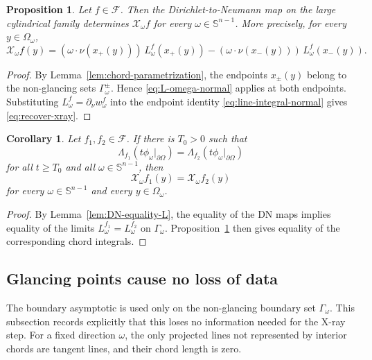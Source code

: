 \documentclass[11pt]{article}
\numberwithin{equation}{section}
\newtheorem{proposition}[theorem]{Proposition}
\newtheorem{corollary}[theorem]{Corollary}
\newcommand{\Sn}{\mathbb S^{n-1}}
\newcommand{\bd}{\partial}
\newcommand{\Om}{\Omega}
\newcommand{\DN}{\Lambda}
\newcommand{\Xray}{\mathcal X}
\begin{document}
\begin{proposition}\label{prop:recover-xray}
Let \(f\in\mathcal F\).  Then the Dirichlet-to-Neumann map on the large cylindrical family determines \(\Xray_\omega f\) for every \(\omega\in\Sn\).  More precisely, for every \(y\in\Omega_\omega\),
\begin{equation}\label{eq:recover-xray}
    \Xray_\omega f(y)
    =
    (\omega\cdot\nu(x_+(y)))\,L_\omega^f(x_+(y))
    -
    (\omega\cdot\nu(x_-(y)))\,L_\omega^f(x_-(y)).
\end{equation}
\end{proposition}

\begin{proof}
By Lemma~\ref{lem:chord-parametrization}, the endpoints \(x_\pm(y)\) belong to the non-glancing sets \(\Gamma_\omega^\pm\).  Hence \eqref{eq:L-omega-normal} applies at both endpoints.  Substituting \(L_\omega^f=\partial_\nu w_\omega^f\) into the endpoint identity \eqref{eq:line-integral-normal} gives \eqref{eq:recover-xray}.
\end{proof}

\begin{corollary}\label{cor:DN-equality-xray}
Let \(f_1,f_2\in\mathcal F\).  If there is \(T_0>0\) such that
\[
    \DN_{f_1}(t\phi_\omega|_{\bd\Om})
    =
    \DN_{f_2}(t\phi_\omega|_{\bd\Om})
\]
for all \(t\ge T_0\) and all \(\omega\in\Sn\), then
\[
    \Xray_\omega f_1(y)=\Xray_\omega f_2(y)
\]
for every \(\omega\in\Sn\) and every \(y\in\Omega_\omega\).
\end{corollary}

\begin{proof}
By Lemma~\ref{lem:DN-equality-L}, the equality of the DN maps implies equality of the limits \(L_\omega^{f_1}=L_\omega^{f_2}\) on \(\Gamma_\omega\).  Proposition~\ref{prop:recover-xray} then gives equality of the corresponding chord integrals.
\end{proof}


\subsection{Glancing points cause no loss of data}\label{subsec:glancing-removal}

The boundary asymptotic is used only on the non-glancing boundary set \(\Gamma_\omega\).  This subsection records explicitly that this loses no information needed for the X-ray step.  For a fixed direction \(\omega\), the only projected lines not represented by interior chords are tangent lines, and their chord length is zero.
\end{document}
